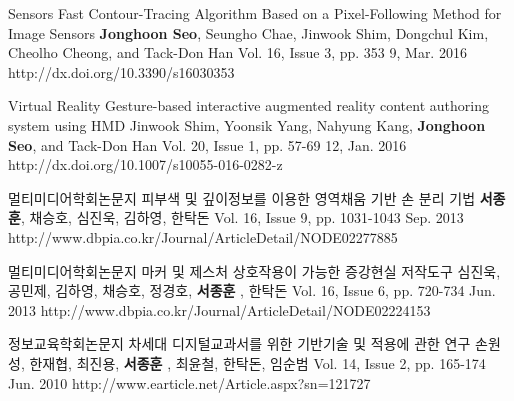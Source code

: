 


\begin{cventries}

  \cvpublicationentry
    {Sensors} %
    {Fast Contour-Tracing Algorithm Based on a Pixel-Following Method for Image Sensors} %
    {\textbf{Jonghoon Seo}, Seungho Chae, Jinwook Shim, Dongchul Kim, Cheolho Cheong, and Tack-Don Han} %
    {Vol. 16, Issue 3, pp. 353}
    {9, Mar. 2016} %
    {http://dx.doi.org/10.3390/s16030353}

  \cvpublicationentry
    {Virtual Reality} %
    {Gesture-based interactive augmented reality content authoring system using HMD} %
    {Jinwook Shim, Yoonsik Yang, Nahyung Kang, \textbf{Jonghoon Seo}, and Tack-Don Han} %
    {Vol. 20, Issue 1, pp. 57-69}
    {12, Jan. 2016} %
    {http://dx.doi.org/10.1007/s10055-016-0282-z}

\end{cventries}

\begin{cventries}

  \cvpublicationentry
    {멀티미디어학회논문지} %
    {피부색 및 깊이정보를 이용한 영역채움 기반 손 분리 기법} %
    {\textbf{서종훈}, 채승호, 심진욱, 김하영, 한탁돈} %
    {Vol. 16, Issue 9, pp. 1031-1043}
    {Sep. 2013} %
    {http://www.dbpia.co.kr/Journal/ArticleDetail/NODE02277885}

  \cvpublicationentry
    {멀티미디어학회논문지} %
    {마커 및 제스처 상호작용이 가능한 증강현실 저작도구} %
    {심진욱, 공민제, 김하영, 채승호, 정경호, \textbf{서종훈} , 한탁돈} %
    {Vol. 16, Issue 6, pp. 720-734}
    {Jun. 2013} %
    {http://www.dbpia.co.kr/Journal/ArticleDetail/NODE02224153}

  \cvpublicationentry
    {정보교육학회논문지} %
    {차세대 디지털교과서를 위한 기반기술 및 적용에 관한 연구} %
    {손원성, 한재협, 최진용, \textbf{서종훈} , 최윤철, 한탁돈, 임순범} %
    {Vol. 14, Issue 2, pp. 165-174}
    {Jun. 2010} %
    {http://www.earticle.net/Article.aspx?sn=121727}


\end{cventries}

